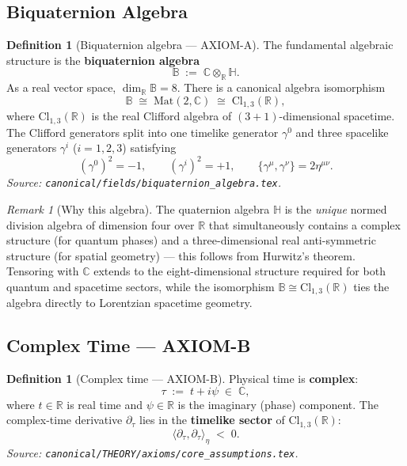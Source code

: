 \documentclass[12pt,a4paper]{article}
\theoremstyle{definition}
\newtheorem{definition}[theorem]{Definition}
\theoremstyle{remark}
\newtheorem{remark}[theorem]{Remark}
\newcommand{\B}{\mathbb{B}}
\newcommand{\R}{\mathbb{R}}
\newcommand{\C}{\mathbb{C}}
\newcommand{\Hquat}{\mathbb{H}}
\newcommand{\pT}{\partial_\tau}
\begin{document}
\subsection{Biquaternion Algebra}
\label{sec:algebra}

\begin{definition}[Biquaternion algebra — AXIOM-A]
\label{def:algebra}
The fundamental algebraic structure is the \textbf{biquaternion algebra}
\[
  \B \;:=\; \C\otimes_\R\Hquat.
\]
As a real vector space, $\dim_\R\B = 8$.  There is a canonical algebra isomorphism
\[
  \B \;\cong\; \mathrm{Mat}(2,\C) \;\cong\; \mathrm{Cl}_{1,3}(\R),
\]
where $\mathrm{Cl}_{1,3}(\R)$ is the real Clifford algebra of $(3+1)$-dimensional
spacetime.  The Clifford generators split into one timelike generator $\gamma^0$
and three spacelike generators $\gamma^i$ ($i=1,2,3$) satisfying
\[
  (\gamma^0)^2 = -1, \qquad (\gamma^i)^2 = +1, \qquad
  \{\gamma^\mu,\gamma^\nu\} = 2\eta^{\mu\nu}.
\]
\textit{Source: \texttt{canonical/fields/biquaternion\_algebra.tex}.}
\end{definition}

\begin{remark}[Why this algebra]
The quaternion algebra $\Hquat$ is the \emph{unique} normed division algebra of
dimension four over $\R$ that simultaneously contains a complex structure (for
quantum phases) and a three-dimensional real anti-symmetric structure (for
spatial geometry) — this follows from Hurwitz's theorem.  Tensoring with $\C$
extends to the eight-dimensional structure required for both quantum and spacetime
sectors, while the isomorphism $\B \cong \mathrm{Cl}_{1,3}(\R)$ ties the algebra
directly to Lorentzian spacetime geometry.
\end{remark}

\subsection{Complex Time — AXIOM-B}
\label{sec:complextime}

\begin{definition}[Complex time — AXIOM-B]
\label{def:complextime}
Physical time is \textbf{complex}:
\[
  \tau \;:=\; t + i\psi \;\in\; \C,
\]
where $t\in\R$ is real time and $\psi\in\R$ is the imaginary (phase) component.
The complex-time derivative $\pT$ lies in the \textbf{timelike sector} of
$\mathrm{Cl}_{1,3}(\R)$:
\[
  \langle \pT, \pT \rangle_\eta \;<\; 0.
\]
\textit{Source: \texttt{canonical/THEORY/axioms/core\_assumptions.tex}.}
\end{definition}
\end{document}

